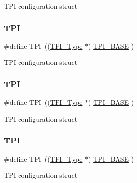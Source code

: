 T\+PI configuration struct \mbox{\label{group___c_m_s_i_s__core__base_ga8b4dd00016aed25a0ea54e9a9acd1239}} 
\subsubsection{\texorpdfstring{TPI}{TPI}\hspace{0.1cm}{\footnotesize\ttfamily [4/8]}}
{\footnotesize\ttfamily \#define T\+PI~((\mbox{\hyperlink{struct_t_p_i___type}{T\+P\+I\+\_\+\+Type}}       $\ast$)     \mbox{\hyperlink{group___c_m_s_i_s__core__base_ga2b1eeff850a7e418844ca847145a1a68}{T\+P\+I\+\_\+\+B\+A\+SE}}      )}

T\+PI configuration struct \mbox{\label{group___c_m_s_i_s__core__base_ga8b4dd00016aed25a0ea54e9a9acd1239}} 
\subsubsection{\texorpdfstring{TPI}{TPI}\hspace{0.1cm}{\footnotesize\ttfamily [5/8]}}
{\footnotesize\ttfamily \#define T\+PI~((\mbox{\hyperlink{struct_t_p_i___type}{T\+P\+I\+\_\+\+Type}}       $\ast$)     \mbox{\hyperlink{group___c_m_s_i_s__core__base_ga2b1eeff850a7e418844ca847145a1a68}{T\+P\+I\+\_\+\+B\+A\+SE}}      )}

T\+PI configuration struct \mbox{\label{group___c_m_s_i_s__core__base_ga8b4dd00016aed25a0ea54e9a9acd1239}} 
\subsubsection{\texorpdfstring{TPI}{TPI}\hspace{0.1cm}{\footnotesize\ttfamily [6/8]}}
{\footnotesize\ttfamily \#define T\+PI~((\mbox{\hyperlink{struct_t_p_i___type}{T\+P\+I\+\_\+\+Type}}       $\ast$)     \mbox{\hyperlink{group___c_m_s_i_s__core__base_ga2b1eeff850a7e418844ca847145a1a68}{T\+P\+I\+\_\+\+B\+A\+SE}}      )}

T\+PI configuration struct \mbox{\label{group___c_m_s_i_s__core__base_ga8b4dd00016aed25a0ea54e9a9acd1239}} 
